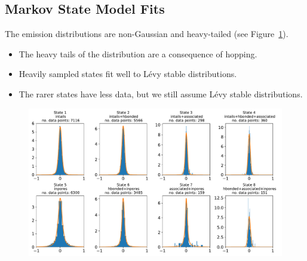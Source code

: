 \documentclass{article}
\begin{document}
  \subsection{Markov State Model Fits}\label{section:msm_results}
  
  The emission distributions are non-Gaussian and heavy-tailed (see Figure~\ref{fig:emissions_MET}).
  \begin{itemize}
    \item The heavy tails of the distribution are a consequence of hopping.
    \item Heavily sampled states fit well to L\'evy stable distributions.
    \item The rarer states have less data, but we still assume L\'evy stable distributions.
  \end{itemize}
  
  \begin{figure}[!h]
  \includegraphics[width=\textwidth]{emissions_MET.pdf}
  \caption{}\label{fig:emissions_MET}
  \end{figure}
\end{document}
